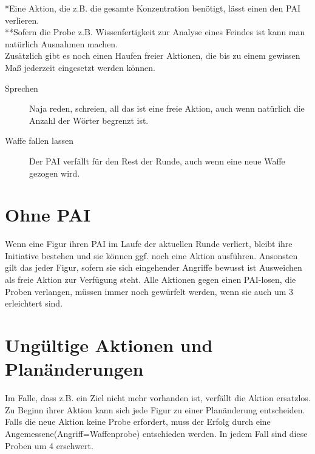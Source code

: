 \documentclass[a4paper,12pt,oneside]{book}
\begin{document}
*Eine Aktion, die z.B. die gesamte Konzentration benötigt, lässt einen den PAI verlieren.
\\**Sofern die Probe z.B. Wissenfertigkeit zur Analyse eines Feindes ist kann man natürlich Ausnahmen machen.
\\Zusätzlich gibt es noch einen Haufen freier Aktionen, die bis zu einem gewissen Maß jederzeit eingesetzt werden können.
\begin{description}
\item[Sprechen]Naja reden, schreien, all das ist eine freie Aktion, auch wenn natürlich die Anzahl der Wörter begrenzt ist.
\item[Waffe fallen lassen]Der PAI verfällt für den Rest der Runde, auch wenn eine neue Waffe gezogen wird.
\end{description}
\chapter{Ohne PAI}
Wenn eine Figur ihren PAI im Laufe der aktuellen Runde verliert, bleibt ihre Initiative bestehen und sie können ggf. noch eine Aktion ausführen. Ansonsten gilt das jeder Figur, sofern sie sich eingehender Angriffe bewusst ist Ausweichen als freie Aktion zur Verfügung steht. Alle Aktionen gegen einen PAI-losen, die Proben verlangen, müssen immer noch gewürfelt werden, wenn sie auch um 3 erleichtert sind.
\chapter{Ungültige Aktionen und Planänderungen}
Im Falle, dass z.B. ein Ziel nicht mehr vorhanden ist, verfällt die Aktion ersatzlos. Zu Beginn ihrer Aktion kann sich jede Figur zu einer Planänderung entscheiden. Falls die neue Aktion keine Probe erfordert, muss der Erfolg durch eine Angemessene(Angriff=Waffenprobe) entschieden werden. In jedem Fall sind diese Proben um 4 erschwert.
\end{document}
